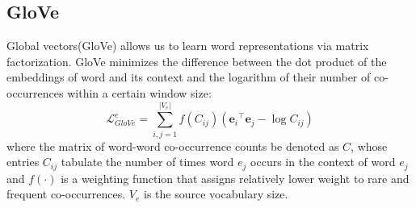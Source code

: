 \subsection{GloVe}
Global vectors(GloVe) allows us to learn word representations via matrix factorization. GloVe minimizes the difference between the dot product of the embeddings of word and its context and the logarithm of their number of co-occurrences within a certain window size:
\[ \mathcal{L}_{GloVe}^e = \sum_{i,j=1}^{\lvert V_e \rvert} f(C_{ij})({\bm{e}_i}^{\top} \bm{e}_j - \log{C_{ij}} ) \]
where the matrix of word-word co-occurrence counts be denoted as $C$, whose entries $C_{ij}$ tabulate the number of times word $e_j$ occurs in the context of word $e_j$ and $f(\cdot)$ is a weighting function that assigns relatively lower weight to rare and frequent co-occurrences. $V_e$ is the source vocabulary size.
%
%
%
